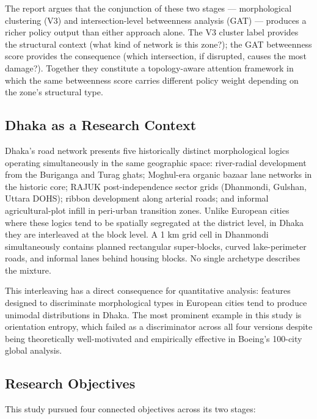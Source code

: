 \documentclass[sigconf, nonacm]{acmart}
\begin{document}
The report argues that the conjunction of these two stages --- morphological clustering (V3) and intersection-level betweenness analysis (GAT) --- produces a richer policy output than either approach alone. The V3 cluster label provides the structural context (what kind of network is this zone?); the GAT betweenness score provides the consequence (which intersection, if disrupted, causes the most damage?). Together they constitute a topology-aware attention framework in which the same betweenness score carries different policy weight depending on the zone's structural type.

\subsection{Dhaka as a Research Context}

Dhaka's road network presents five historically distinct morphological logics operating simultaneously in the same geographic space: river-radial development from the Buriganga and Turag ghats; Moghul-era organic bazaar lane networks in the historic core; RAJUK post-independence sector grids (Dhanmondi, Gulshan, Uttara DOHS); ribbon development along arterial roads; and informal agricultural-plot infill in peri-urban transition zones. Unlike European cities where these logics tend to be spatially segregated at the district level, in Dhaka they are interleaved at the block level. A 1 km grid cell in Dhanmondi simultaneously contains planned rectangular super-blocks, curved lake-perimeter roads, and informal lanes behind housing blocks. No single archetype describes the mixture.

This interleaving has a direct consequence for quantitative analysis: features designed to discriminate morphological types in European cities tend to produce unimodal distributions in Dhaka. The most prominent example in this study is orientation entropy, which failed as a discriminator across all four versions despite being theoretically well-motivated and empirically effective in Boeing's \cite{boeing2021} 100-city global analysis.

\subsection{Research Objectives}

This study pursued four connected objectives across its two stages:
\end{document}
